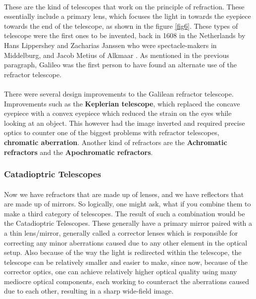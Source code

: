 \documentclass[a4paper,twoside]{article}
\numberwithin{equation}{section}
\begin{document}
\paragraph{}
These are the kind of telescopes that work on the principle of refraction. These essentially include a primary lens, which focuses the light in towards the eyepiece towards the end of the telescope, as shown in the figure \ref{fig6}. These types of telescope were the first ones to be invented, back in 1608 in the Netherlands by Hans Lippershey and Zacharias Janssen who were spectacle-makers in Middelburg, and Jacob Metius of Alkmaar \cite{Refractor1}. As mentioned in the previous paragraph, Galileo was the first person to have found an alternate use of the refractor telescope. 
\paragraph{}
There were several design improvements to the Galilean refractor telescope. Improvements such as the \textbf{Keplerian telescope}, which replaced the concave eyepiece with a convex eyepiece which reduced the strain on the eyes while looking at an object. This however had the image inverted and required precise optics to counter one of the biggest problems with refractor telescopes, \textbf{chromatic aberration}. Another kind of refractors are the \textbf{Achromatic refractors} and the \textbf{Apochromatic refractors}.
\subsubsection{Catadioptric Telescopes}
\paragraph{}
Now we have refractors that are made up of lenses, and we have reflectors that are made up of mirrors. So logically, one might ask, what if you combine them to make a third category of telescopes. The result of such a combination would be the Catadioptric Telescopes. These generally have a primary mirror paired with a a thin lens/mirror, generally called a corrector lenses which is responsible for correcting any minor aberrations caused due to any other element in the optical setup. Also because of the way the light is redirected within the telescope, the telescope can be relatively smaller and easier to make, since now, because of the corrector optics, one can achieve relatively higher optical quality using many mediocre optical components, each working to counteract the aberrations caused due to each other, resulting in a sharp wide-field image. 
\end{document}

